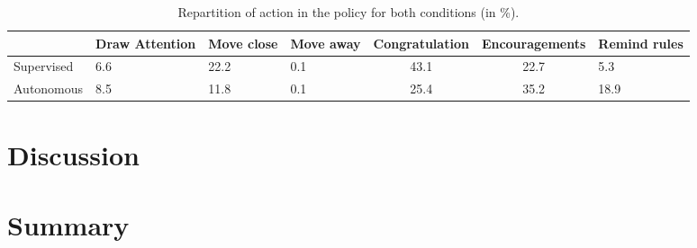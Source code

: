 \begin{table}[ht]
	\centering
	\caption{Repartition of action in the policy for both conditions (in \%).}
	\label{tab:tutoring_policies}
	\begin{tabularx}{\textwidth}{@{}lYYYccY}\toprule
		& Draw \newline Attention & Move \newline close & Move \newline away & Congratulation & Encouragements & Remind \newline rules \\
		\midrule
		Supervised & 6.6  & 22.2 & 0.1 & 43.1 & 22.7 & 5.3 \\
		Autonomous & 8.5 & 11.8 & 0.1 & 25.4 & 35.2 & 18.9\\
		\bottomrule
	\end{tabularx}
\end{table}

\section{Discussion}

\section{Summary}

